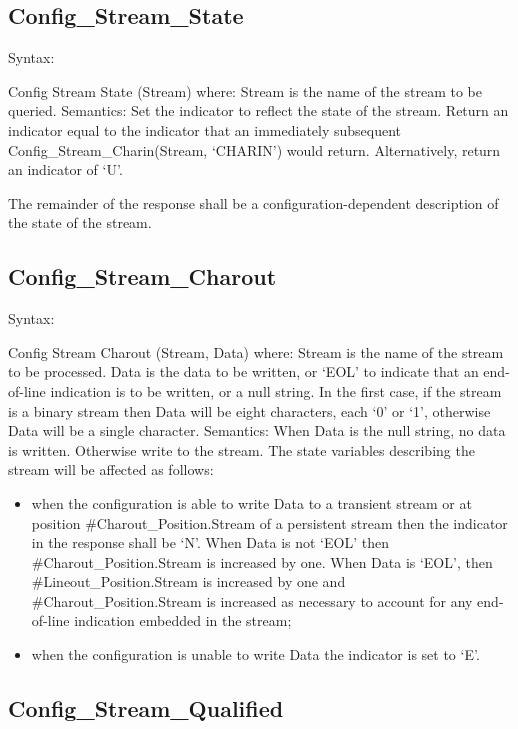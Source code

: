 \hypertarget{config_stream_state}{%
\subsection{Config\_Stream\_State}\label{config_stream_state}}

Syntax:

Config Stream State (Stream) where: Stream is the name of the stream to
be queried. Semantics: Set the indicator to reflect the state of the
stream. Return an indicator equal to the indicator that an immediately
subsequent Config\_Stream\_Charin(Stream, `CHARIN') would return.
Alternatively, return an indicator of `U'.

The remainder of the response shall be a configuration-dependent
description of the state of the stream.

\hypertarget{config_stream_charout}{%
\subsection{Config\_Stream\_Charout}\label{config_stream_charout}}

Syntax:

Config Stream Charout (Stream, Data) where: Stream is the name of the
stream to be processed. Data is the data to be written, or `EOL' to
indicate that an end-of-line indication is to be written, or a null
string. In the first case, if the stream is a binary stream then Data
will be eight characters, each `0' or `1', otherwise Data will be a
single character. Semantics: When Data is the null string, no data is
written. Otherwise write to the stream. The state variables describing
the stream will be affected as follows:

\begin{itemize}
\item
  when the configuration is able to write Data to a transient stream or
  at position \#Charout\_Position.Stream of a persistent stream then the
  indicator in the response shall be `N'. When Data is not `EOL' then
  \#Charout\_Position.Stream is increased by one. When Data is `EOL',
  then \#Lineout\_Position.Stream is increased by one and
  \#Charout\_Position.Stream is increased as necessary to account for
  any end-of-line indication embedded in the stream;
\item
  when the configuration is unable to write Data the indicator is set to
  `E'.
\end{itemize}

\hypertarget{config_stream_qualified}{%
\subsection{Config\_Stream\_Qualified}\label{config_stream_qualified}}

